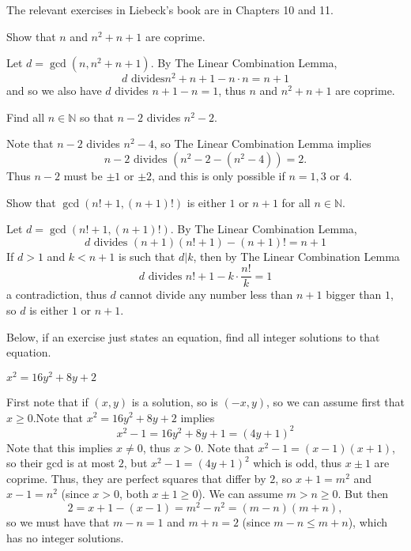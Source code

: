\documentclass[11pt,dvipsnames]{book}
\numberwithin{equation}{section} %
\numberwithin{figure}{section} %
\numberwithin{table}{section} %
\begin{document}
The relevant exercises in Liebeck's book are in Chapters 10 and 11.





\begin{exercise} Show that $n$ and $n^2+n+1$ are coprime. 

\begin{solution}
Let $d=\gcd(n,n^2+n+1)$. By The Linear Combination Lemma,
\[
d\text{ divides} n^2+n+1 - n\cdot n = n+1 
\]
and so we also have $d$ divides $ n+1 - n =1$, thus $n$ and $n^2+n+1$ are coprime.
\end{solution}
\end{exercise}




\begin{exercise} Find all $n\in\mathbb{N}$ so that $n-2$ divides $n^2-2$. 

\begin{solution}
Note that $n-2$ divides $n^2-4$, so The Linear Combination Lemma implies 
\[
n-2\text{ divides } (n^2-2-(n^2-4))=2.
\]
Thus $n-2$ must be $\pm 1$ or $\pm 2$, and this is only possible if $n=1,3$ or $4$.
\end{solution}

 
\end{exercise}



\begin{exercise} Show that $\gcd(n!+1,(n+1)!)$ is either $1$ or $n+1$ for all $n\in\mathbb{N}$.

\begin{solution}
Let $d=\gcd(n!+1,(n+1)!)$. By The Linear Combination Lemma,
\[
d \text{ divides } (n+1)(n!+1)-(n+1)! = n+1
\]
If $d>1$ and $k<n+1$ is such that $d|k$, then  by The Linear Combination Lemma
\[
d \text{ divides } n!+1- k\cdot \frac{n!}{k} =1
\]
a contradiction, thus $d$ cannot divide any number less than $n+1$ bigger than $1$, so $d$ is either $1$ or $n+1$. 
\end{solution}


\end{exercise}


Below, if an exercise just states an equation, find all integer solutions to that equation.



\begin{exercise}
 $x^2=16y^2+8y+2$

\begin{solution}
First note that if $(x,y)$ is a solution, so is $(-x,y)$, so we can assume first that $x\geq 0$.Note that $x^2=16y^2+8y+2$ implies
\[
x^2-1 =16y^2+8y+1=(4y+1)^2
\]
Note that this implies $x\neq 0$, thus $x>0$. Note that $x^2-1=(x-1)(x+1)$, so their gcd is at most $2$, but $x^2-1=(4y+1)^2$ which is odd, thus $x\pm 1$ are coprime. Thus, they are perfect squares that differ by $2$, so $x+1=m^2$ and $x-1=n^2$ (since $x>0$, both $x\pm 1\geq 0$). We can assume  $m>n\geq 0$. But then
\[
2= x+1-(x-1) = m^2-n^2 = (m-n)(m+n),
\]
so we must have that $m-n=1$ and $m+n=2$ (since $m-n\leq m+n$), which has no integer solutions. 
\end{solution}
\end{exercise}
\end{document}
